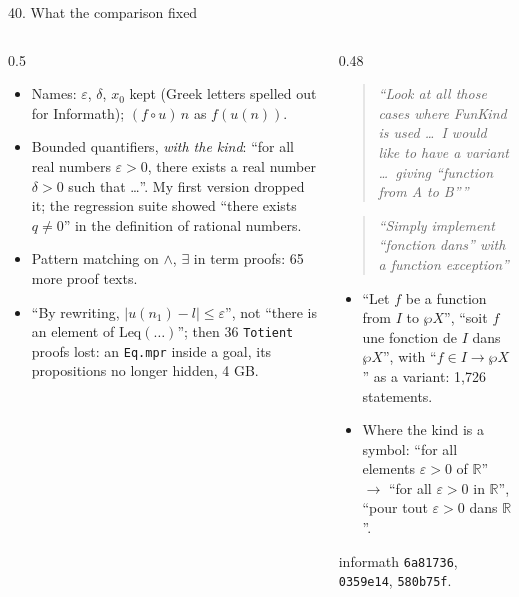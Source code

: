 \documentclass[10pt,aspectratio=169]{beamer}
\newcommand{\bad}[1]{\textcolor{warn}{#1}}
\newcommand{\ok}[1]{\textcolor{good}{#1}}
\newcommand{\commit}[1]{\texttt{\footnotesize #1}}
\newcommand{\prompt}[1]{\begin{quote}\small\itshape ``#1''\end{quote}}
\begin{document}
\begin{frame}{40. What the comparison fixed}
  \scriptsize
  \begin{columns}[T]
    \begin{column}{0.5\textwidth}
      \begin{itemize}
        \item Names: \ok{$\varepsilon$, $\delta$, $x_0$} kept (Greek letters spelled out for
              Informath); $(f \circ u)\,n$ as \ok{$f(u(n))$}.
        \item Bounded quantifiers, \emph{with the kind}: \ok{``for all real numbers $\varepsilon
              > 0$, there exists a real number $\delta > 0$ such that \ldots''}. My first version
              dropped it; the regression suite showed \bad{``there exists $q \neq 0$''} in the
              definition of rational numbers.
        \item Pattern matching on $\wedge$, $\exists$ in term proofs: 65 more proof texts.
        \item ``By rewriting, $|u(n_1) - l| \leq \varepsilon$'', not \bad{``there is an element of
              $\mathrm{Leq}(\ldots)$''}; then 36 \texttt{Totient} proofs \bad{lost}: an
              \texttt{Eq.mpr} inside a goal, its propositions no longer hidden, 4 GB.
      \end{itemize}
    \end{column}
    \begin{column}{0.48\textwidth}
      \prompt{Look at all those cases where FunKind is used \ldots\ I would like to have a
      variant \ldots\ giving ``function from A to B''}
      \prompt{Simply implement ``fonction dans'' with a function exception}
      \begin{itemize}
        \item \ok{``Let $f$ be a function from $I$ to $\wp X$''}, ``soit $f$ une fonction de $I$
              dans $\wp X$'', with ``$f \in I \rightarrow \wp X$'' as a variant: 1,726
              statements.
        \item Where the kind is a symbol: \bad{``for all elements $\varepsilon > 0$ of
              $\mathbb{R}$''} $\to$ \ok{``for all $\varepsilon > 0$ in $\mathbb{R}$''},
              ``pour tout $\varepsilon > 0$ dans $\mathbb{R}$''.
      \end{itemize}
      informath \commit{6a81736}, \commit{0359e14}, \commit{580b75f}.
    \end{column}
  \end{columns}
\end{frame}
\end{document}
